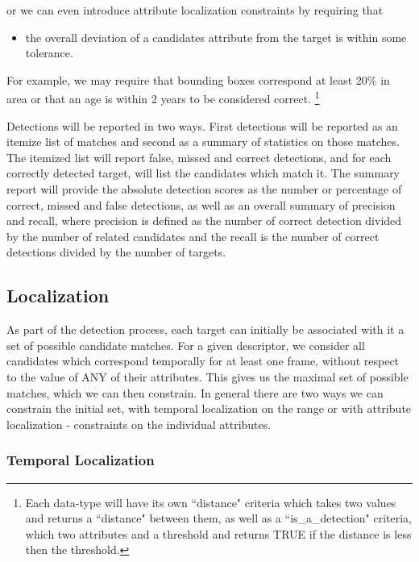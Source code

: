 \noindent or we can even introduce attribute localization constraints by requiring
that 

\begin{itemize}
\item the overall deviation of a candidates attribute from the target is within
some tolerance.  
\end{itemize}

For example, we may require that bounding boxes correspond at least
20\% in area or that an age is within 2 years to be considered correct.
\footnote{Each data-type will have its own ``distance" criteria
which takes two values and returns a ``distance" between them, as well
as a ``is\_a\_detection" criteria, which two attributes and a
threshold and returns TRUE if the distance is less then the
threshold. }


Detections will be reported in two ways. First detections will be
reported as an itemize list of matches and second as a summary of
statistics on those matches.  The itemized list will report false,
missed and correct detections, and for each correctly detected target,
will list the candidates which match it.  The summary report will
provide the absolute detection scores as the number or percentage of
correct, missed and false detections, as well as an overall summary of
precision and recall, where precision is defined as the number of
correct detection divided by the number of related candidates and the
recall is the number of correct detections divided by the number of
targets.

\subsection {Localization}
As part of the detection process, each target can initially be
associated with it a set of possible candidate matches. For a given
descriptor, we consider all candidates which correspond temporally for
at least one frame, without respect to the value of ANY of their
attributes.  This gives us the maximal set of possible matches, which
we can then constrain.  In general there are two ways we can constrain
the initial set, with temporal localization on the range or with
attribute localization - constraints on the individual attributes.


\subsubsection {Temporal Localization}

